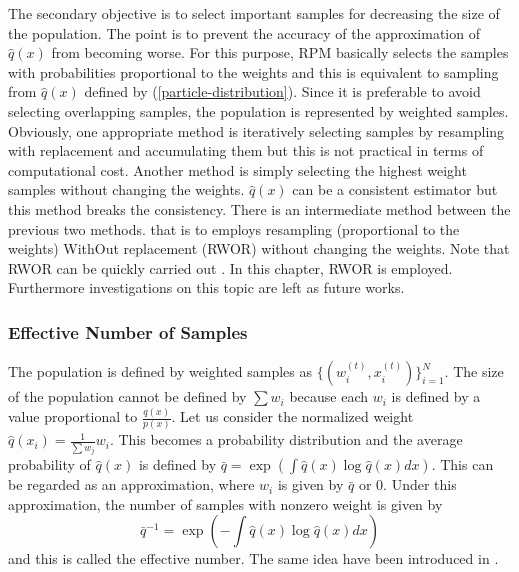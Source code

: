 The secondary objective is to select important samples for
decreasing the size of the population.
The point is to prevent the accuracy of the approximation of
$\hat q(x)$ from becoming worse.
For this purpose,
RPM basically selects the samples with probabilities proportional to the
weights and this is equivalent to
sampling from $\hat q(x)$ defined by (\ref{particle-distribution}).
Since it is preferable to avoid selecting overlapping samples,
the population is represented by weighted samples.
Obviously, one appropriate method is iteratively 
selecting  samples by resampling with replacement and accumulating them
but this is not practical in terms of computational cost.
Another method is
simply selecting the highest weight samples without changing the weights.
$\hat q(x)$ can be a consistent estimator but this method
breaks the consistency. 
There is an intermediate method between the previous two methods.
that is to employs resampling (proportional to the weights) WithOut replacement (RWOR) without
changing the weights.
Note that RWOR can be quickly carried out \cite{efraimidis:rwor}.
In this chapter, RWOR is employed. 
Furthermore investigations on this topic are left as future works.


\subsubsection{Effective Number of Samples}
The population is defined by weighted samples
as $\{(w^{(t)}_i,x^{(t)}_i)\}_{i=1}^{N}$.
The size of the population cannot be defined by $\sum w_i$
because each $w_i$ is defined by a value proportional to
$\frac{q(x)}{p(x)}$.
Let us consider the normalized weight $\hat q(x_i)=\frac{1}{\sum w_j}{w_i}$.
This becomes a probability distribution and
the average probability of $\hat q(x)$
is defined by $\bar q=\exp(\int \hat q(x) \log \hat q(x)dx)$.
This can be regarded as an approximation,
where $w_i$ is given by $\bar q$ or $0$.
Under this approximation,
the number of samples with nonzero weight is given by
\begin{equation}
 \bar q^{-1}=\exp(-\int \hat q(x) \log \hat q(x)dx)
\end{equation}
and this is called the effective number.
The same idea have been introduced in \cite{shimodaira:wis-aic}.



